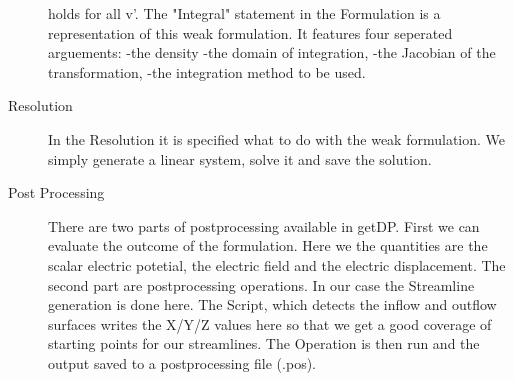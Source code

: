 \documentclass[preprint,journal]{vgtc}       %
\begin{document}
\begin{description}
	holds for all v'.
	The "Integral" statement in the Formulation is a representation of this weak formulation. It features four seperated arguements:
	-the density\newline
	-the domain of integration, \newline
	-the Jacobian of the transformation, \newline
	-the integration method to be used.\newline
	\item[Resolution]
	In the Resolution it is specified what to do with the weak formulation. We simply generate a linear system, solve it and save the solution. %
	\item[Post Processing]
	There are two parts of postprocessing available in getDP. First we can evaluate the outcome of the formulation. Here we the quantities are the scalar electric potetial, the electric field and the electric displacement.
	The second part are postprocessing operations. In our case the Streamline generation is done here. The Script, which detects the inflow and outflow surfaces writes the X/Y/Z values here so that we get a good coverage of starting points for our streamlines. The Operation is then run and the output saved to a postprocessing file (.pos).
	\end{description}
\end{document}
